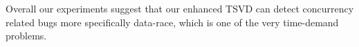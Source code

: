 
Overall our experiments suggest that our enhanced TSVD can detect concurrency related bugs more specifically data-race, which is one of the very time-demand problems. 







%
%
%
%
%





